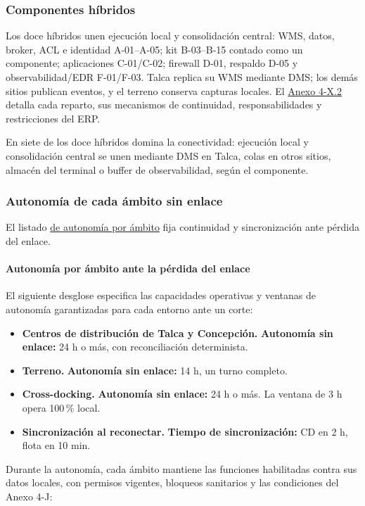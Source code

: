 \subsubsection{Componentes híbridos}

Los doce híbridos unen ejecución local y consolidación central: WMS, datos, broker, ACL e identidad A-01--A-05; kit B-03--B-15 contado como un componente; aplicaciones C-01/C-02; firewall D-01, respaldo D-05 y observabilidad/EDR F-01/F-03. Talca replica su WMS mediante DMS; los demás sitios publican eventos, y el terreno conserva capturas locales. El \href{LAFROX-Subdocumento4-Anexos.pdf#anx:X-hibridos}{Anexo 4-X.2} detalla cada reparto, sus mecanismos de continuidad, responsabilidades y restricciones del ERP.

En siete de los doce híbridos domina la conectividad: ejecución local y consolidación central se unen mediante DMS en Talca, colas en otros sitios, almacén del terminal o buffer de observabilidad, según el componente.

\subsubsection{Autonomía de cada ámbito sin enlace}

El listado \hyperref[tab:t29]{de autonomía por ámbito} fija continuidad y sincronización ante pérdida del enlace.

\paragraph*{Autonomía por ámbito ante la pérdida del enlace}
\label{tab:t29}
El siguiente desglose especifica las capacidades operativas y ventanas de autonomía garantizadas para cada entorno ante un corte:
\begin{itemize}
\item \textbf{Centros de distribución de Talca y Concepción.} \textbf{Autonomía sin enlace:} 24 h o más, con reconciliación determinista.
\item \textbf{Terreno.} \textbf{Autonomía sin enlace:} 14 h, un turno completo.
\item \textbf{Cross-docking.} \textbf{Autonomía sin enlace:} 24 h o más. La ventana de 3 h opera 100\,\% local.
\item \textbf{Sincronización al reconectar.} \textbf{Tiempo de sincronización:} CD en 2 h, flota en 10 min.
\end{itemize}


Durante la autonomía, cada ámbito mantiene las funciones habilitadas contra sus datos locales, con permisos vigentes, bloqueos sanitarios y las condiciones del Anexo 4-J:

